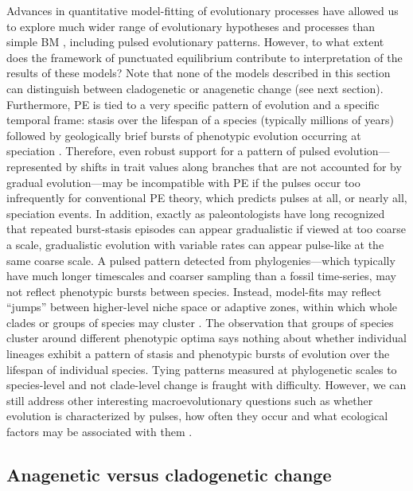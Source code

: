 Advances in quantitative model-fitting of evolutionary processes have allowed us to explore much wider range of evolutionary hypotheses and processes than simple BM \citep{PennellHarmon}, including pulsed evolutionary patterns. However, to what extent does the framework of punctuated equilibrium contribute to interpretation of the results of these models? Note that none of the models described in this section can distinguish between cladogenetic or anagenetic change (see next section). Furthermore, PE is tied to a very specific pattern of evolution and a specific temporal frame: stasis over the lifespan of a species (typically millions of years) followed by geologically brief bursts of phenotypic evolution occurring at speciation \citep{EldredgeGould1972, GouldEldredge1977, Gould2002}.  Therefore, even robust support for a pattern of pulsed evolution---represented by shifts in trait values along branches that are not accounted for by gradual evolution---may be incompatible with PE if the pulses occur too infrequently for conventional PE theory, which predicts pulses at all, or nearly all, speciation events. In addition, exactly as paleontologists have long recognized that repeated burst-stasis episodes can appear gradualistic if viewed at too coarse a scale, gradualistic evolution with variable rates can appear pulse-like at the same coarse scale. A pulsed pattern detected from phylogenies---which typically have much longer timescales and coarser sampling than a fossil time-series, may not reflect phenotypic bursts between species. Instead, model-fits may reflect ``jumps'' between higher-level niche space or adaptive zones, within which whole clades or groups of species may cluster \citep{Simpson1944, Hansen1997, Hansen2012book, Eastmanjump}. The observation that groups of species cluster around different phenotypic optima says nothing about whether individual lineages exhibit a pattern of stasis and phenotypic bursts of evolution over the lifespan of individual species. Tying patterns measured at phylogenetic scales to species-level and not clade-level change is fraught with difficulty. However, we can still address other interesting macroevolutionary questions such as whether evolution is characterized by pulses, how often they occur and what ecological factors may be associated with them \citep{Eastmanjump}.

\subsection{Anagenetic versus cladogenetic change}

